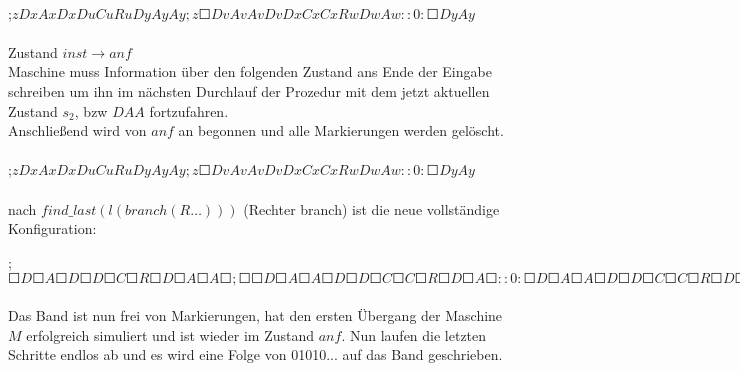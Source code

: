 \documentclass[10pt, a4paper]{article}
\begin{document}
\begin{small}
\par
\paragraph{}
;$z D x  A x  D x  D u  C u R u  D y  A y  A y ; z  \Square D v  A v  A v  D v  D x  C x  C x  R w  D w  A  w  :: 0 : \Square D y A y$
\end{small}\par

\paragraph{}
Zustand $inst\rightarrow anf$\\
Maschine muss Information über den folgenden Zustand ans Ende der Eingabe schreiben um ihn im nächsten Durchlauf der Prozedur mit dem jetzt aktuellen Zustand $s_2$, bzw $DAA$ fortzufahren.\\
Anschließend wird von $anf$ an begonnen und alle Markierungen werden gelöscht.


\begin{small}
\par
\paragraph{}
;$z D x  A x  D x  D u  C u R u  D y  A y  A y ; z  \Square D v  A v  A v  D v  D x  C x  C x  R w  D w  A  w  ::0: \Square D y A y$
\end{small}\par
\paragraph{}
nach $find\_last(l(branch(R \dots )))$ (Rechter branch) ist die neue vollständige Konfiguration:\\
\begin{small}
;$\Square D\Square A\Square D\Square D\Square C\Square R\Square D\Square A\Square A\Square ;\Square \Square D\Square A\Square A\Square D\Square D\Square C\Square C\Square R\Square D\Square A\Square :: 0 : \Square D \Square A \Square A \Square D\Square D\Square C\Square C\Square R\Square D\Square A \Square$\\
\end{small}\par
\paragraph{}
Das Band ist nun frei von Markierungen, hat den ersten Übergang der Maschine $M$ erfolgreich simuliert und ist wieder im Zustand $anf$. Nun laufen die letzten Schritte endlos ab und es wird eine Folge von 01010... auf das Band geschrieben.
\end{document}
